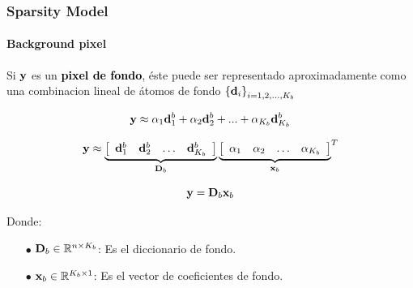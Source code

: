 \documentclass[spanish,xcolor=dvipsnames]{beamer}
\begin{document}
    \begin{frame}
   	\frametitle{Sparsity Model}
    	\framesubtitle{Background pixel}

 Si ${\bf y}$ es un \textcolor{black} {\bf pixel de fondo}, éste puede ser representado aproximadamente como una combinacion lineal de átomos de fondo ${\{{\bf d}_i\}}_{i=1,2,...,K_b}$  

	\begin{equation}
	\nonumber  {\bf y} \approx {\alpha}_1{\bf d}_1^b+{\alpha}_2{\bf d}_2^b+...+{\alpha}_{ K_b} {\bf d}_{K_b}^b
	\end{equation}

	\begin{equation}
	\nonumber  {\bf y} \approx \underbrace{ \left[ \begin {array}{cccc} 
{\bf d}_1^b & {\bf d}_2^b & \ldots & {\bf d}_{K_b}^b \end {array} \right]}_{{\bf D}_b}
 {\underbrace{ \left[ \begin{array}{cccc} {\alpha}_1 & {\alpha}_2 & \ldots & {\alpha}_{K_b} \end{array} \right]} _{{\bf x}_b}}^T
	\end{equation}

	\begin{equation}
	\nonumber  {\bf y} = {\bf D}_b  {\bf x}_b
    	\end{equation}

Donde:
	\begin{itemize}	
		\item[\color {black}\bf $\bullet$] ${\bf D}_b \in \mathbb{R}^{n \times {K_b}}$: Es el diccionario de fondo.\\
		\item[\color {black}\bf $\bullet$] ${\bf x}_b \in \mathbb{R}^{K_b \times 1}$: Es el vector de coeficientes de fondo.\\
	\end{itemize}
 
    \end{frame}
\end{document}
